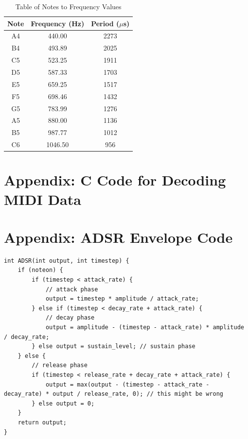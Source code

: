 \documentclass[12pt]{article}
\begin{document}
\begin{table}[H]
    \centering
    \begin{tabular}{|c|c|c|}
    \hline
    Note & Frequency (Hz) & Period ($\mu$s) \\
    \hline
        A4 & 440.00 & 2273 \\
        B4 & 493.89 & 2025 \\
        C5 & 523.25 & 1911 \\
        D5 & 587.33 & 1703 \\
        E5 & 659.25 & 1517 \\
        F5 & 698.46 & 1432 \\
        G5 & 783.99 & 1276 \\
        A5 & 880.00 & 1136 \\
        B5 & 987.77 & 1012 \\
        C6 & 1046.50 & 956 \\
        \hline
    \end{tabular}
    \caption{Table of Notes to Frequency Values}
    \label{tab:pianonotestofrequency}
\end{table}

\section{Appendix: C Code for Decoding MIDI Data}\label{sec:appendix-b:-c-code-for-decoding-midi-data}


\section{Appendix: ADSR Envelope Code}\label{sec:appendix-c:-adsr-envelope-code}

\begin{lstlisting}
int ADSR(int output, int timestep) {
    if (noteon) {
        if (timestep < attack_rate) {
            // attack phase
            output = timestep * amplitude / attack_rate;
        } else if (timestep < decay_rate + attack_rate) {
            // decay phase
            output = amplitude - (timestep - attack_rate) * amplitude / decay_rate;
        } else output = sustain_level; // sustain phase
    } else {
        // release phase
        if (timestep < release_rate + decay_rate + attack_rate) {
            output = max(output - (timestep - attack_rate - decay_rate) * output / release_rate, 0); // this might be wrong
        } else output = 0;
    }
    return output;
}
\end{lstlisting}
\end{document}
